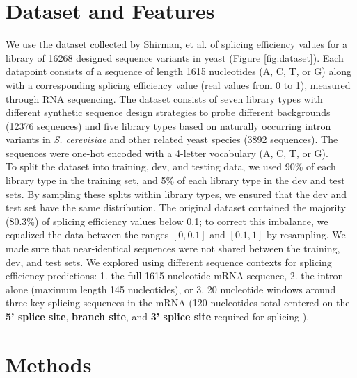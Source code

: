 \documentclass{article}
\begin{document}
\section{Dataset and Features}
We use the dataset collected by Shirman, et al. \cite{pilpel} of splicing efficiency values for a library of 16268 designed sequence variants in yeast (Figure \ref{fig:dataset}). Each datapoint consists of a sequence of length 1615 nucleotides (A, C, T, or G) along with a corresponding splicing efficiency value (real values from 0 to 1), measured through RNA sequencing. The dataset consists of seven library types with different synthetic sequence design strategies to probe different backgrounds (12376 sequences) and five library types based on naturally occurring intron variants in {\it S. cerevisiae} and other related yeast species (3892 sequences). The sequences were one-hot encoded with a 4-letter vocabulary (A, C, T, or G).
\newline \\
To split the dataset into training, dev, and testing data, we used 90\% of each library type in the training set, and 5\% of each library type in the dev and test sets. By sampling these splits within library types, we ensured that the dev and test set have the same distribution. The original dataset contained the majority (80.3\%) of splicing efficiency values below 0.1; to correct this imbalance, we equalized the data between the ranges $[0, 0.1]$ and $[0.1, 1]$ by resampling. We made sure that near-identical sequences were not shared between the training, dev, and test sets. We explored using different sequence contexts for splicing efficiency predictions: 1. the full 1615 nucleotide mRNA sequence, 2. the intron alone (maximum length 145 nucleotides), or 3. 20 nucleotide windows around three key splicing sequences in the mRNA (120 nucleotides total centered on the {\bf 5' splice site}, {\bf branch site}, and  {\bf 3' splice site} required for splicing \cite{splicingreview}).

\section{ Methods }
\end{document}
